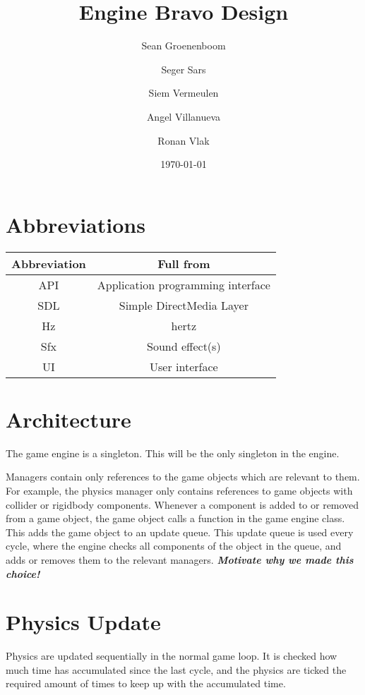 \documentclass[draft]{article}
\title{Engine Bravo Design}
\author{Sean Groenenboom \and Seger Sars \and Siem Vermeulen \and Angel Villanueva \and Ronan Vlak} %
\date{\today}
\begin{document}
\maketitle %
\newpage

\tableofcontents
\newpage

\section{Abbreviations}
\begin{tabular}{c|c}
  \textbf{Abbreviation} & \textbf{Full from} \\ \hline
  API & Application programming interface \\ \hline
  SDL & Simple DirectMedia Layer \\ \hline
  Hz & hertz \\ \hline
  Sfx & Sound effect(s) \\ \hline
  UI & User interface \\
\end{tabular}

\section{Architecture}
The game engine is a singleton. This will be the only singleton in the engine.

Managers contain only references to the game objects which are relevant to them. For example, the physics manager only contains references to game objects with collider or rigidbody components.
Whenever a component is added to or removed from a game object, the game object calls a function in the game engine class. This adds the game object to an update queue. This update queue is used every cycle, where the engine checks all components of the object in the queue, and adds or removes them to the relevant managers.
\textbf{\textit{Motivate why we made this choice!}}

\section{Physics Update}
Physics are updated sequentially in the normal game loop. It is checked how much time has accumulated since the last cycle, and the physics are ticked the required amount of times to keep up with the accumulated time.
\end{document}
